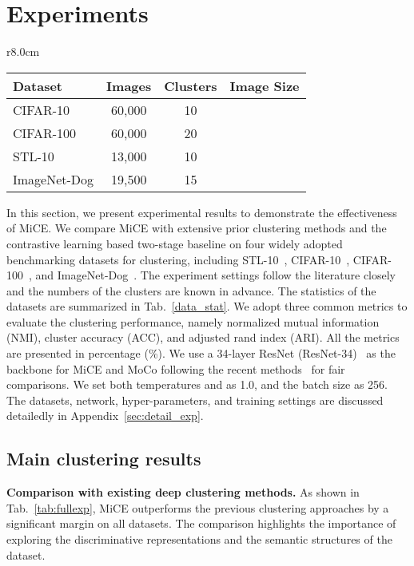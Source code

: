 \documentclass{article} \usepackage{iclr2021_conference,times}
\begin{document}
\section{Experiments}
\label{sec:experiments_start}

\begin{wraptable}{r}{8.0cm}
\caption{Statistics of the datasets. 
}
\begin{tabular}{lccc}
    \toprule
    Dataset       & Images  & Clusters & Image Size                                   \\ \hline
    CIFAR-10       & 60,000  & 10      &  \\
    CIFAR-100   & 60,000  & 20      &  \\
    STL-10         & 13,000 & 10      &     \\ 
    ImageNet-Dog & 19,500 & 15     &  \\\bottomrule
    \end{tabular}\label{data_stat}
\end{wraptable}
In this section, we present experimental results to demonstrate the effectiveness of MiCE.
We compare MiCE with extensive prior clustering methods and the contrastive learning based two-stage baseline on four widely adopted benchmarking datasets for clustering, including STL-10~\citep{coates2011an}, CIFAR-10~\citep{krizhevsky2009learning}, CIFAR-100~\citep{krizhevsky2009learning}, and ImageNet-Dog~\citep{chang2017deep}. 
The experiment settings follow the literature closely~\citep{chang2017deep,wu2019deep,ji2019invariant,shiran2019multi,darlow2020dhog} and the numbers of the clusters are known in advance. The statistics of the datasets are summarized in Tab.~\ref{data_stat}. We adopt three common metrics to evaluate the clustering performance, namely normalized mutual information (NMI), cluster accuracy (ACC), and adjusted rand index (ARI). All the metrics are presented in percentage (\%). We use a 34-layer ResNet (ResNet-34)~\citep{he2016deep} as the backbone for MiCE and MoCo following the recent methods~\citep{ji2019invariant,shiran2019multi} for fair comparisons. 
We set both temperatures  and  as 1.0, and the batch size as 256. 
The datasets, network, hyper-parameters, and training settings are discussed detailedly in Appendix~\ref{sec:detail_exp}.






\subsection{Main clustering results}
{\bf Comparison with existing deep clustering methods.} As shown in Tab.~\ref{tab:fullexp}, MiCE outperforms the previous clustering approaches by a significant margin on all datasets. The comparison highlights the importance of exploring the discriminative representations and the semantic structures of the dataset.
\end{document}
